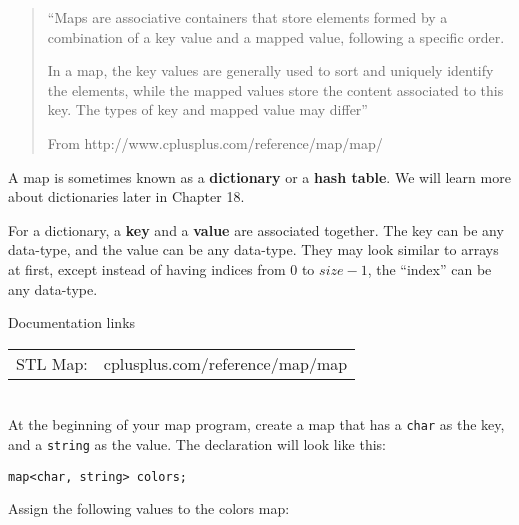         \begin{mdframed}
            \begin{quote}
                ``Maps are associative containers that store elements formed by a combination of a key value and a mapped value, following a specific order.

                In a map, the key values are generally used to sort and uniquely identify the elements, while the mapped values store the content associated to this key. The types of key and mapped value may differ''

                \footnotesize{From http://www.cplusplus.com/reference/map/map/}
            \end{quote}
        \end{mdframed}

        A map is sometimes known as a \textbf{dictionary} or a \textbf{hash table}. We will learn more about
        dictionaries later in Chapter 18.

        For a dictionary, a \textbf{key} and a \textbf{value} are associated together. The key
        can be any data-type, and the value can be any data-type. They may look similar to arrays
        at first, except instead of having indices from $0$ to $size-1$, the ``index'' can be any
        data-type.
        
        \begin{hint}{Documentation links} ~\\
            \begin{tabular}{ l l }
                STL Map:       & cplusplus.com/reference/map/map \\
            \end{tabular}
        \end{hint}

        ~\\ At the beginning of your map program, create a map that has a \texttt{char} as the key, and
        a \texttt{string} as the value. The declaration will look like this:

        \begin{center}
            \texttt{map<char, string> colors;}
        \end{center}

        Assign the following values to the colors map:
        
